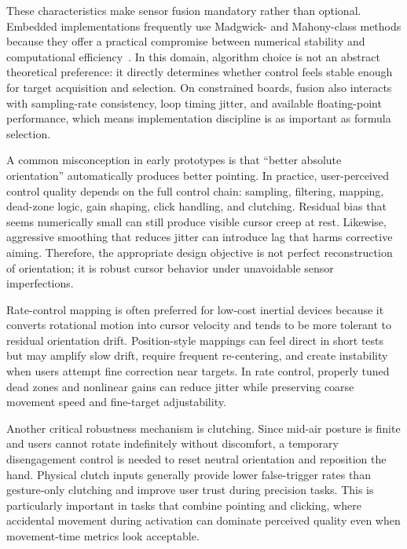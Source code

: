 These characteristics make sensor fusion mandatory rather than optional. Embedded implementations frequently use Madgwick- and Mahony-class methods because they offer a practical compromise between numerical stability and computational efficiency~\cite{madgwick2010efficient,mahony2008nonlinear}. In this domain, algorithm choice is not an abstract theoretical preference: it directly determines whether control feels stable enough for target acquisition and selection. On constrained boards, fusion also interacts with sampling-rate consistency, loop timing jitter, and available floating-point performance, which means implementation discipline is as important as formula selection.

A common misconception in early prototypes is that ``better absolute orientation'' automatically produces better pointing. In practice, user-perceived control quality depends on the full control chain: sampling, filtering, mapping, dead-zone logic, gain shaping, click handling, and clutching. Residual bias that seems numerically small can still produce visible cursor creep at rest. Likewise, aggressive smoothing that reduces jitter can introduce lag that harms corrective aiming. Therefore, the appropriate design objective is not perfect reconstruction of orientation; it is robust cursor behavior under unavoidable sensor imperfections.

Rate-control mapping is often preferred for low-cost inertial devices because it converts rotational motion into cursor velocity and tends to be more tolerant to residual orientation drift. Position-style mappings can feel direct in short tests but may amplify slow drift, require frequent re-centering, and create instability when users attempt fine correction near targets. In rate control, properly tuned dead zones and nonlinear gains can reduce jitter while preserving coarse movement speed and fine-target adjustability.

Another critical robustness mechanism is clutching. Since mid-air posture is finite and users cannot rotate indefinitely without discomfort, a temporary disengagement control is needed to reset neutral orientation and reposition the hand. Physical clutch inputs generally provide lower false-trigger rates than gesture-only clutching and improve user trust during precision tasks. This is particularly important in tasks that combine pointing and clicking, where accidental movement during activation can dominate perceived quality even when movement-time metrics look acceptable.

